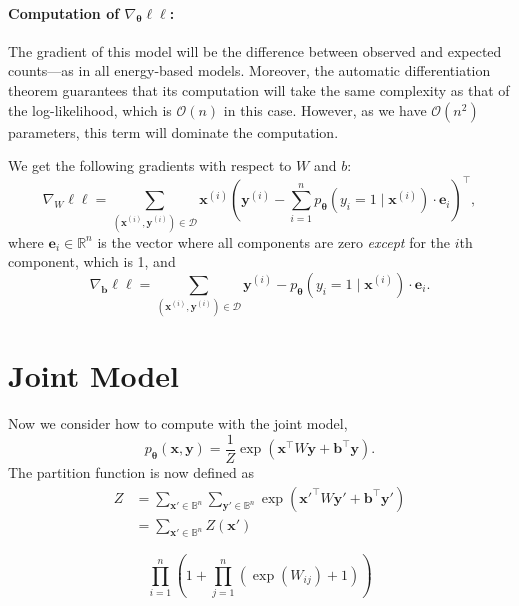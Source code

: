 \documentclass[12pt]{article}
\renewcommand{\vec}{\boldsymbol}   %
\newcommand{\x}{\vec{x}}
\newcommand{\y}{\vec{y}}
\renewcommand{\xi}{\vec{x}^{(i)}}
\newcommand{\yi}{\vec{y}^{(i)}}
\newcommand{\B}{\mathbb{B}}
\newcommand{\vtheta}{\vec{\theta}}
\begin{document}
\paragraph{Computation of $\nabla_{\vtheta} \ell\ell$:}
The gradient of this model will be the difference between observed
and expected counts---as in all energy-based models. Moreover, the
automatic differentiation theorem guarantees that its computation
will take the same complexity as that of the log-likelihood, which is
$\mathcal{O}(n)$ in this case. However, as we have $\mathcal{O}(n^2)$
parameters, this term will dominate the computation.

We get the following gradients with respect to $W$ and $b$:
\begin{equation}
  \nabla_{W} \ell\ell = \sum_{(\xi, \yi) \in \mathcal{D}} \xi \left(\yi - \sum_{i=1}^n p_{\vtheta}(y_i = 1 \mid \xi) \cdot \vec{e}_i  \right)^{\top},
\end{equation}
where $\vec{e}_i \in \mathbb{R}^n$ is the vector where all components are zero {\em except} for the $i$th
component, which is 1, and
\begin{equation}
\nabla_{\vec{b}}\ell\ell = \sum_{(\xi, \yi) \in \mathcal{D}} \yi - p_{\vtheta}(y_i = 1 \mid \xi) \cdot \vec{e}_i .
\end{equation}


\section{Joint Model}
Now we consider how to compute with the joint model,
\begin{equation}
p_{\vtheta}(\x, \y) = \frac{1}{Z} \exp\left(\x^{\top}W \y + \vec{b}^{\top} \y \right).
\end{equation}
The partition function is now defined as
\begin{align}
  Z &= \sum_{\x' \in \B^n}\sum_{\y' \in \B^n} \exp\left(\x'^{\top} W\y' + \vec{b}^{\top} \y' \right) \\
  &= \sum_{\x' \in \B^n} Z(\x')
\end{align}

\begin{equation}
  \prod_{i=1}^n \left(1 + \prod_{j=1}^n \left( \exp(W_{ij}) + 1 \right) \right)
\end{equation}
\end{document}
